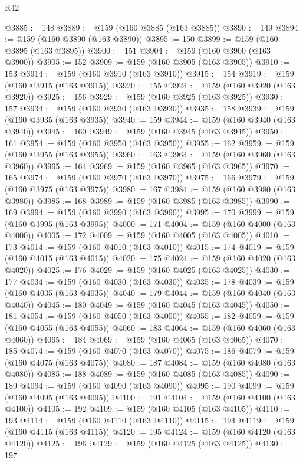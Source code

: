 \begin{lexlean}{R42}
\begin{coremodule}
@3885 := 148
@3889 := @159 (@160 @3885 (@163 @3885))
@3890 := 149
@3894 := @159 (@160 @3890 (@163 @3890))
@3895 := 150
@3899 := @159 (@160 @3895 (@163 @3895))
@3900 := 151
@3904 := @159 (@160 @3900 (@163 @3900))
@3905 := 152
@3909 := @159 (@160 @3905 (@163 @3905))
@3910 := 153
@3914 := @159 (@160 @3910 (@163 @3910))
@3915 := 154
@3919 := @159 (@160 @3915 (@163 @3915))
@3920 := 155
@3924 := @159 (@160 @3920 (@163 @3920))
@3925 := 156
@3929 := @159 (@160 @3925 (@163 @3925))
@3930 := 157
@3934 := @159 (@160 @3930 (@163 @3930))
@3935 := 158
@3939 := @159 (@160 @3935 (@163 @3935))
@3940 := 159
@3944 := @159 (@160 @3940 (@163 @3940))
@3945 := 160
@3949 := @159 (@160 @3945 (@163 @3945))
@3950 := 161
@3954 := @159 (@160 @3950 (@163 @3950))
@3955 := 162
@3959 := @159 (@160 @3955 (@163 @3955))
@3960 := 163
@3964 := @159 (@160 @3960 (@163 @3960))
@3965 := 164
@3969 := @159 (@160 @3965 (@163 @3965))
@3970 := 165
@3974 := @159 (@160 @3970 (@163 @3970))
@3975 := 166
@3979 := @159 (@160 @3975 (@163 @3975))
@3980 := 167
@3984 := @159 (@160 @3980 (@163 @3980))
@3985 := 168
@3989 := @159 (@160 @3985 (@163 @3985))
@3990 := 169
@3994 := @159 (@160 @3990 (@163 @3990))
@3995 := 170
@3999 := @159 (@160 @3995 (@163 @3995))
@4000 := 171
@4004 := @159 (@160 @4000 (@163 @4000))
@4005 := 172
@4009 := @159 (@160 @4005 (@163 @4005))
@4010 := 173
@4014 := @159 (@160 @4010 (@163 @4010))
@4015 := 174
@4019 := @159 (@160 @4015 (@163 @4015))
@4020 := 175
@4024 := @159 (@160 @4020 (@163 @4020))
@4025 := 176
@4029 := @159 (@160 @4025 (@163 @4025))
@4030 := 177
@4034 := @159 (@160 @4030 (@163 @4030))
@4035 := 178
@4039 := @159 (@160 @4035 (@163 @4035))
@4040 := 179
@4044 := @159 (@160 @4040 (@163 @4040))
@4045 := 180
@4049 := @159 (@160 @4045 (@163 @4045))
@4050 := 181
@4054 := @159 (@160 @4050 (@163 @4050))
@4055 := 182
@4059 := @159 (@160 @4055 (@163 @4055))
@4060 := 183
@4064 := @159 (@160 @4060 (@163 @4060))
@4065 := 184
@4069 := @159 (@160 @4065 (@163 @4065))
@4070 := 185
@4074 := @159 (@160 @4070 (@163 @4070))
@4075 := 186
@4079 := @159 (@160 @4075 (@163 @4075))
@4080 := 187
@4084 := @159 (@160 @4080 (@163 @4080))
@4085 := 188
@4089 := @159 (@160 @4085 (@163 @4085))
@4090 := 189
@4094 := @159 (@160 @4090 (@163 @4090))
@4095 := 190
@4099 := @159 (@160 @4095 (@163 @4095))
@4100 := 191
@4104 := @159 (@160 @4100 (@163 @4100))
@4105 := 192
@4109 := @159 (@160 @4105 (@163 @4105))
@4110 := 193
@4114 := @159 (@160 @4110 (@163 @4110))
@4115 := 194
@4119 := @159 (@160 @4115 (@163 @4115))
@4120 := 195
@4124 := @159 (@160 @4120 (@163 @4120))
@4125 := 196
@4129 := @159 (@160 @4125 (@163 @4125))
@4130 := 197

\end{coremodule}
\end{lexlean}
